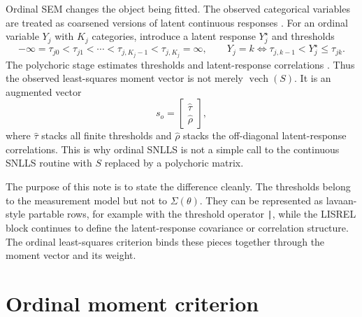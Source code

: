\documentclass[11pt]{article}
\newcommand{\vech}{\operatorname{vech}}
\begin{document}
Ordinal SEM changes the object being fitted. The observed categorical
variables are treated as coarsened versions of latent continuous responses
\citep{muthen1984categorical}. For an ordinal variable \(Y_j\) with
\(K_j\) categories, introduce a latent response \(Y_j^\star\) and thresholds
\[
  -\infty=\tau_{j0}<\tau_{j1}<\cdots<\tau_{j,K_j-1}<\tau_{j,K_j}=\infty,
  \qquad
  Y_j=k
  \Longleftrightarrow
  \tau_{j,k-1}<Y_j^\star\leq\tau_{jk}.
\]
The polychoric stage estimates thresholds and latent-response correlations
\citep{olsson1979polychoric}. Thus the observed least-squares moment vector is
not merely \(\vech(S)\). It is an augmented vector
\begin{equation}
  s_o =
  \begin{bmatrix}
    \hat\tau \\
    \hat\rho
  \end{bmatrix},
  \label{eq:ordinal-sample-moments}
\end{equation}
where \(\hat\tau\) stacks all finite thresholds and \(\hat\rho\) stacks the
off-diagonal latent-response correlations. This is why ordinal SNLLS is not a
simple call to the continuous SNLLS routine with \(S\) replaced by a
polychoric matrix.

The purpose of this note is to state the difference cleanly. The thresholds
belong to the measurement model but not to \(\Sigma(\theta)\). They can be
represented as lavaan-style partable rows, for example with the threshold
operator \texttt{|}, while the LISREL block continues to define the
latent-response covariance or correlation structure. The ordinal least-squares
criterion binds these pieces together through the moment vector and its weight.

\section{Ordinal moment criterion}
\label{sec:criterion}
\end{document}
